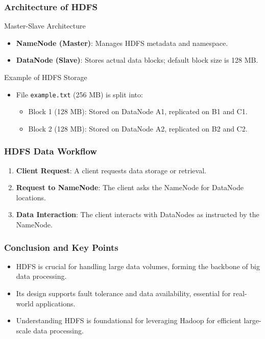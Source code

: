 \documentclass[aspectratio=169]{beamer}
\begin{document}
\begin{frame}[fragile]
    \frametitle{Architecture of HDFS}
    \begin{block}{Master-Slave Architecture}
        \begin{itemize}
            \item \textbf{NameNode (Master)}: Manages HDFS metadata and namespace.
            \item \textbf{DataNode (Slave)}: Stores actual data blocks; default block size is 128 MB.
        \end{itemize}
    \end{block}
    \begin{block}{Example of HDFS Storage}
        \begin{itemize}
            \item File \texttt{example.txt} (256 MB) is split into:
            \begin{itemize}
                \item Block 1 (128 MB): Stored on DataNode A1, replicated on B1 and C1.
                \item Block 2 (128 MB): Stored on DataNode A2, replicated on B2 and C2.
            \end{itemize}
        \end{itemize}
    \end{block}
\end{frame}

\begin{frame}[fragile]
    \frametitle{HDFS Data Workflow}
    \begin{enumerate}
        \item \textbf{Client Request}: A client requests data storage or retrieval.
        \item \textbf{Request to NameNode}: The client asks the NameNode for DataNode locations.
        \item \textbf{Data Interaction}: The client interacts with DataNodes as instructed by the NameNode.
    \end{enumerate}
\end{frame}

\begin{frame}[fragile]
    \frametitle{Conclusion and Key Points}
    \begin{itemize}
        \item HDFS is crucial for handling large data volumes, forming the backbone of big data processing.
        \item Its design supports fault tolerance and data availability, essential for real-world applications.
        \item Understanding HDFS is foundational for leveraging Hadoop for efficient large-scale data processing.
    \end{itemize}
\end{frame}
\end{document}
